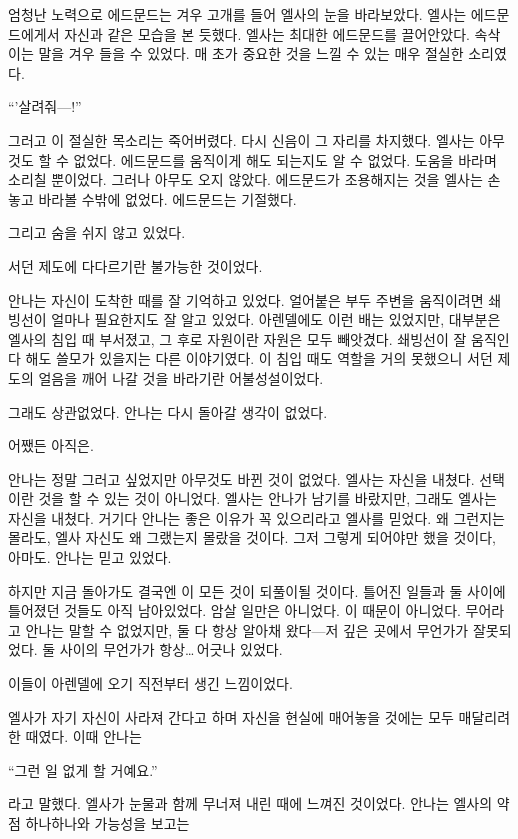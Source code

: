 엄청난 노력으로 에드문드는 겨우 고개를 들어 엘사의 눈을 바라보았다. 엘사는 에드문드에게서 자신과 같은 모습을 본 듯했다. 엘사는 최대한 에드문드를 끌어안았다. 속삭이는 말을 겨우 들을 수 있었다. 매 초가 중요한 것을 느낄 수 있는 매우 절실한 소리였다.

``'살려줘—!''

그러고 이 절실한 목소리는 죽어버렸다. 다시 신음이 그 자리를 차지했다. 엘사는 아무것도 할 수 없었다. 에드문드를 움직이게 해도 되는지도 알 수 없었다. 도움을 바라며 소리칠 뿐이었다. 그러나 아무도 오지 않았다. 에드문드가 조용해지는 것을 엘사는 손 놓고 바라볼 수밖에 없었다. 에드문드는 기절했다.

그리고 숨을 쉬지 않고 있었다.

\textbreak

서던 제도에 다다르기란 불가능한 것이었다.

안나는 자신이 도착한 때를 잘 기억하고 있었다. 얼어붙은 부두 주변을 움직이려면 쇄빙선이 얼마나 필요한지도 잘 알고 있었다. 아렌델에도 이런 배는 있었지만, 대부분은 엘사의 침입 때 부서졌고, 그 후로 자원이란 자원은 모두 빼앗겼다. 쇄빙선이 잘 움직인다 해도 쓸모가 있을지는 다른 이야기였다. 이 침입 때도 역할을 거의 못했으니 서던 제도의 얼음을 깨어 나갈 것을 바라기란 어불성설이었다.

그래도 상관없었다. 안나는 다시 돌아갈 생각이 없었다.

어쨌든 아직은.

안나는 정말 그러고 싶었지만 아무것도 바뀐 것이 없었다. 엘사는 자신을 내쳤다. 선택이란 것을 할 수 있는 것이 아니었다. 엘사는 안나가 남기를 바랐지만, 그래도 엘사는 자신을 내쳤다. 거기다 안나는 좋은 이유가 꼭 있으리라고 엘사를 믿었다. 왜 그런지는 몰라도, 엘사 자신도 왜 그랬는지 몰랐을 것이다. 그저 그렇게 되어야만 했을 것이다, 아마도. 안나는 믿고 있었다.

하지만 지금 돌아가도 결국엔 이 모든 것이 되풀이될 것이다. 틀어진 일들과 둘 사이에 틀어졌던 것들도 아직 남아있었다. 암살 일만은 아니었다. 이 때문이 아니었다. 무어라고 안나는 말할 수 없었지만, 둘 다 항상 알아채 왔다—저 깊은 곳에서 무언가가 잘못되었다. 둘 사이의 무언가가 항상\ldots\,어긋나 있었다.

이들이 아렌델에 오기 직전부터 생긴 느낌이었다.

엘사가 자기 자신이 사라져 간다고 하며 자신을 현실에 매어놓을 것에는 모두 매달리려 한 때였다. 이때 안나는

``그런 일 없게 할 거예요.''

라고 말했다. 엘사가 눈물과 함께 무너져 내린 때에 느껴진 것이었다. 안나는 엘사의 약점 하나하나와 가능성을 보고는

